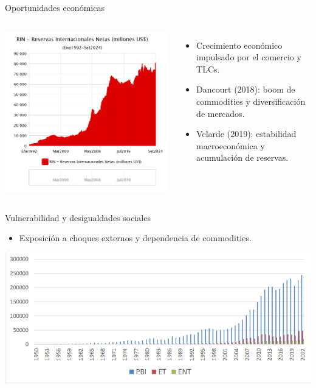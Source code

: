 \documentclass[aspectratio=169]{beamer}
\begin{document}
\begin{frame}{\Large Oportunidades económicas}
    \begin{columns}
            \includegraphics[width=\textwidth]{images/rin.jpg}
            \Large
            \begin{itemize}
                \item Crecimiento económico impulsado por el comercio y TLCs.
                \item Dancourt (2018): boom de commodities y diversificación de mercados.
                \item Velarde (2019): estabilidad macroeconómica y acumulación de reservas.
            \end{itemize}

    \end{columns}
\end{frame}

\begin{frame}{\Large Vulnerabilidad y desigualdades sociales}
    \begin{itemize}
        \item Exposición a choques externos y dependencia de commodities.
    \end{itemize}
    \includegraphics[width=\textwidth]{images/pbi_et_ent.png}
\end{frame}
\end{document}
